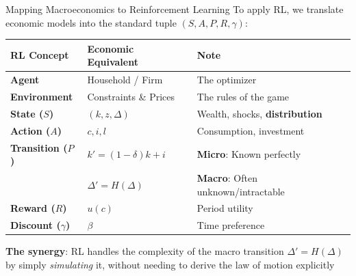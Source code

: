 \documentclass[10pt,english,aspectratio=169]{beamer}
\begin{document}
\begin{frame}{Mapping Macroeconomics to Reinforcement Learning}
\vspace{-0.3cm}
To apply RL, we translate economic models into the standard tuple $(S, A, P, R, \gamma)$:

\vspace{0.2cm}
\begin{table}[]
\centering
\renewcommand{\arraystretch}{1.4}
\scriptsize
\begin{tabular}{l | l | l}
\textbf{RL Concept} & \textbf{Economic Equivalent} & \textbf{Note} \\
\hline
\textbf{Agent} & Household / Firm & The optimizer \\
\hline
\textbf{Environment} & Constraints \& Prices & The rules of the game \\
\hline
\textbf{State ($S$)} & $(k, z, \Delta)$ & Wealth, shocks, \textbf{distribution} \\
\hline
\textbf{Action ($A$)} & $c, i, l$ & Consumption, investment \\
\hline
\textbf{Transition ($P$)} & $k' = (1-\delta)k + i$ & \textbf{Micro}: Known perfectly \\
& $\Delta' = H(\Delta)$ & \textbf{Macro}: Often unknown/intractable \\
\hline
\textbf{Reward ($R$)} & $u(c)$ & Period utility \\
\hline
\textbf{Discount ($\gamma$)} & $\beta$ & Time preference \\
\end{tabular}
\end{table}

\vspace{0.2cm}
\textbf{The synergy}: RL handles the complexity of the macro transition $\Delta' = H(\Delta)$ by simply \emph{simulating} it, without needing to derive the law of motion explicitly
\end{frame}
\end{document}
